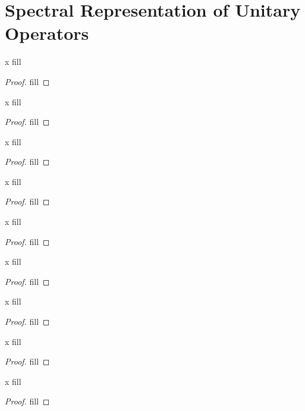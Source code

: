 \section{Spectral Representation of Unitary Operators}


\begin{exercise}{x}
fill
\end{exercise}
\begin{proof}
fill
\end{proof} 

\begin{exercise}{x}
fill
\end{exercise}
\begin{proof}
fill
\end{proof} 

\begin{exercise}{x}
fill
\end{exercise}
\begin{proof}
fill
\end{proof} 

\begin{exercise}{x}
fill
\end{exercise}
\begin{proof}
fill
\end{proof} 

\begin{exercise}{x}
fill
\end{exercise}
\begin{proof}
fill
\end{proof} 

\begin{exercise}{x}
fill
\end{exercise}
\begin{proof}
fill
\end{proof} 

\begin{exercise}{x}
fill
\end{exercise}
\begin{proof}
fill
\end{proof} 

\begin{exercise}{x}
fill
\end{exercise}
\begin{proof}
fill
\end{proof} 

\begin{exercise}{x}
fill
\end{exercise}
\begin{proof}
fill
\end{proof} 


